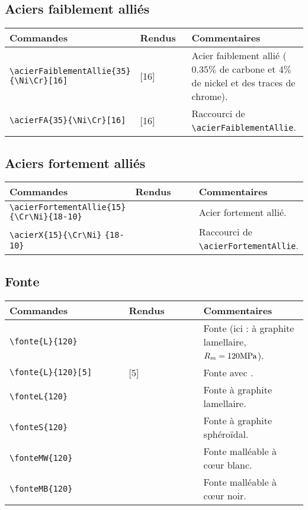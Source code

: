 \documentclass[a4paper,12pt]{article}
\begin{document}
	\subsection{Aciers faiblement alliés}

		\noindent
		\begin{tabular}{|p{0.4\linewidth}|p{0.2\linewidth}|p{0.4\linewidth}|}
			\hline
				\textbf{Commandes}&\textbf{Rendus}&\textbf{Commentaires}
			\\\hline\hline
				\verb!\acierFaiblementAllie{35}! \verb!{\Ni\Cr}[16]!	&	\acierFaiblementAllie{35}{\Ni\Cr}[16]	&	Acier faiblement allié ($0.35\%$ de carbone et $4\%$ de nickel et des traces de chrome).
			\\\hline
				\verb!\acierFA{35}{\Ni\Cr}[16]!	&	\acierFA{35}{\Ni\Cr}[16]	&	Raccourci de \verb!\acierFaiblementAllie!.
			\\\hline
		\end{tabular}

	\subsection{Aciers fortement alliés}

		\noindent
		\begin{tabular}{|p{0.4\linewidth}|p{0.25\linewidth}|p{0.35\linewidth}|}
			\hline
				\textbf{Commandes}&\textbf{Rendus}&\textbf{Commentaires}
			\\\hline\hline
				\verb!\acierFortementAllie{15}! \verb!{\Cr\Ni}{18-10}!	&	\acierFortementAllie{15}{\Cr\Ni}{18-10}	&	Acier fortement allié.
			\\\hline
				\verb!\acierX{15}{\Cr\Ni}! \verb!{18-10}!			&	\acierX{15}{\Cr\Ni}{18-10}			&	Raccourci de \verb!\acierFortementAllie!.
			\\\hline
		\end{tabular}

	\subsection{Fonte}

		\begin{tabular}{|p{0.4\linewidth}|p{0.25\linewidth}|p{0.35\linewidth}|}
			\hline
				\textbf{Commandes}&\textbf{Rendus}&\textbf{Commentaires}
			\\\hline\hline
				\verb!\fonte{L}{120}!	&	\fonte{L}{120}		&	Fonte (ici : à graphite lamellaire, $R_m=120\text{MPa}$).
			\\\hline
				\verb!\fonte{L}{120}[5]!&	\fonte{L}{120}[5]	&	Fonte avec \matAp.
			\\\hline
				\verb!\fonteL{120}!	&	\fonteL{120}		&	Fonte à graphite lamellaire.
			\\\hline
				\verb!\fonteS{120}!	&	\fonteS{120}		&	Fonte à graphite sphéroïdal.
			\\\hline
				\verb!\fonteMW{120}!	&	\fonteMW{120}		&	Fonte malléable à c\oe ur blanc.
			\\\hline
				\verb!\fonteMB{120}!	&	\fonteMB{120}		&	Fonte malléable à c\oe ur noir.
			\\\hline
		\end{tabular}
\end{document}
